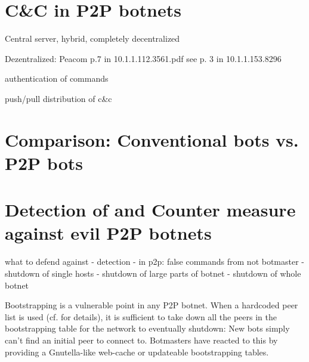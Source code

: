 \documentclass{llncs}
\begin{document}
\section{C\&C in P2P botnets}
Central server, hybrid, completely decentralized

Dezentralized: Peacom p.7 in 10.1.1.112.3561.pdf
see p. 3 in 10.1.1.153.8296

authentication of commands

push/pull distribution of c\&c

\section{Comparison: Conventional bots vs. P2P bots}

\section{Detection of and Counter measure against evil P2P botnets}
\label{counter-measure}
what to defend against
- detection
- in p2p: false commands from not botmaster
- shutdown of single hosts
- shutdown of large parts of botnet
- shutdown of whole botnet

Bootstrapping is a vulnerable point in any P2P botnet. When a hardcoded peer list is used (cf. for details), it is sufficient to take down all the peers in the bootstrapping table for the network to eventually shutdown: New bots simply can't find an initial peer to connect to. Botmasters have reacted to this by providing a Gnutella-like web-cache or updateable bootstrapping tables.



\end{document}
